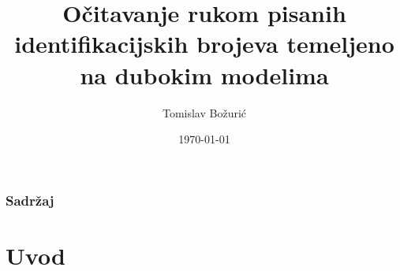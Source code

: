 \documentclass{beamer}
\title[Diplomski rad]{Očitavanje rukom pisanih identifikacijskih brojeva temeljeno na dubokim modelima} %
\author{Tomislav Božurić} %
\institute[FER] %
{
Fakultet elektrotehnike i računarstva \\ %
\medskip
Diplomski rad\\
\bigskip
Mentor: doc.dr.sc. Marko Čupić}
\date{\today } %
\begin{document}
\begin{frame}
\titlepage %
\end{frame}

\begin{frame}
\frametitle{Sadržaj} %
\tableofcontents %
\end{frame}


\section{Uvod} %
\end{document}
